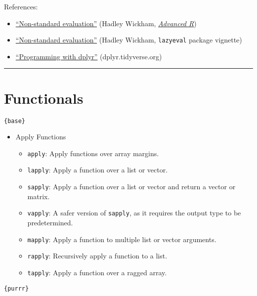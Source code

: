 \documentclass[
]{book}
\providecommand{\tightlist}{%
  \setlength{\itemsep}{0pt}\setlength{\parskip}{0pt}}
\begin{document}
References:

\begin{itemize}
\tightlist
\item
  \href{http://adv-r.had.co.nz/Computing-on-the-language.html}{``Non-standard evaluation''} (Hadley Wickham, \href{http://adv-r.had.co.nz/}{\emph{Advanced R}})
\item
  \href{https://cran.r-project.org/web/packages/lazyeval/vignettes/lazyeval.html}{``Non-standard evaluation''} (Hadley Wickham, \texttt{lazyeval} package vignette)
\item
  \href{https://dplyr.tidyverse.org/articles/programming.html}{``Programming with dplyr''} (dplyr.tidyverse.org)
\end{itemize}

\begin{center}\rule{0.5\linewidth}{0.5pt}\end{center}

\hypertarget{functionals}{%
\section{Functionals}\label{functionals}}

\texttt{\{base\}}

\begin{itemize}
\tightlist
\item
  Apply Functions

  \begin{itemize}
  \tightlist
  \item
    \texttt{apply}: Apply functions over array margins.
  \item
    \texttt{lapply}: Apply a function over a list or vector.
  \item
    \texttt{sapply}: Apply a function over a list or vector and return a vector or matrix.
  \item
    \texttt{vapply}: A safer version of \texttt{sapply}, as it requires the output type to be predetermined.
  \item
    \texttt{mapply}: Apply a function to multiple list or vector arguments.
  \item
    \texttt{rapply}: Recursively apply a function to a list.
  \item
    \texttt{tapply}: Apply a function over a ragged array.
  \end{itemize}
\end{itemize}

\texttt{\{purrr\}}
\end{document}
